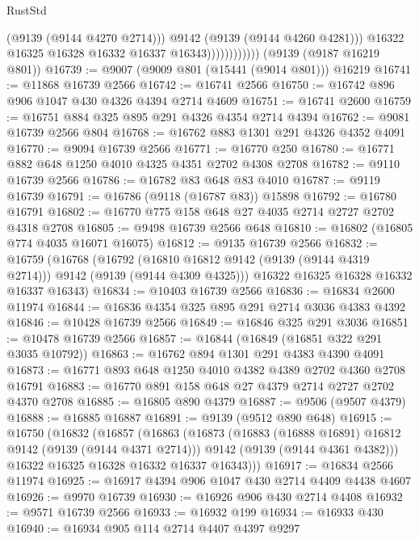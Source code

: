 \begin{lexlean}{RustStd}
\begin{coremodule}
                                (@9139 (@9144 @4270 @2714)))
                              @9142
                              (@9139 (@9144 @4260 @4281)))
                            @16322
                            @16325
                            @16328
                            @16332
                            @16337
                            @16343))))))))))))
    (@9139 (@9187 @16219 @801))
@16739 := @9007 (@9009 @801 (@15441 (@9014 @801))) @16219
@16741 := @11868 @16739 @2566
@16742 := @16741 @2566
@16750 := @16742 @896 @906 @1047 @430 @4326 @4394 @2714 @4609
@16751 := @16741 @2600
@16759 := @16751 @884 @325 @895 @291 @4326 @4354 @2714 @4394
@16762 := @9081 @16739 @2566 @804
@16768 := @16762 @883 @1301 @291 @4326 @4352 @4091
@16770 := @9094 @16739 @2566
@16771 := @16770 @250
@16780 := @16771 @882 @648 @1250 @4010 @4325 @4351 @2702 @4308 @2708
@16782 := @9110 @16739 @2566
@16786 := @16782 @83 @648 @83 @4010
@16787 := @9119 @16739
@16791 := @16786 (@9118 (@16787 @83)) @15898
@16792 := @16780 @16791
@16802 := @16770 @775 @158 @648 @27 @4035 @2714 @2727 @2702 @4318 @2708
@16805 := @9498 @16739 @2566 @648
@16810 := @16802 (@16805 @774 @4035 @16071 @16075)
@16812 := @9135 @16739 @2566
@16832 := @16759
    (@16768
      (@16792 (@16810 @16812 @9142 (@9139 (@9144 @4319 @2714))) @9142 (@9139 (@9144 @4309 @4325)))
      @16322
      @16325
      @16328
      @16332
      @16337
      @16343)
@16834 := @10403 @16739 @2566
@16836 := @16834 @2600 @11974
@16844 := @16836 @4354 @325 @895 @291 @2714 @3036 @4383 @4392
@16846 := @10428 @16739 @2566
@16849 := @16846 @325 @291 @3036
@16851 := @10478 @16739 @2566
@16857 := @16844 (@16849 (@16851 @322 @291 @3035 @10792))
@16863 := @16762 @894 @1301 @291 @4383 @4390 @4091
@16873 := @16771 @893 @648 @1250 @4010 @4382 @4389 @2702 @4360 @2708 @16791
@16883 := @16770 @891 @158 @648 @27 @4379 @2714 @2727 @2702 @4370 @2708
@16885 := @16805 @890 @4379
@16887 := @9506 (@9507 @4379)
@16888 := @16885 @16887
@16891 := @9139 (@9512 @890 @648)
@16915 := @16750
    (@16832
      (@16857
        (@16863
          (@16873
            (@16883 (@16888 @16891) @16812 @9142 (@9139 (@9144 @4371 @2714)))
            @9142
            (@9139 (@9144 @4361 @4382)))
          @16322
          @16325
          @16328
          @16332
          @16337
          @16343)))
@16917 := @16834 @2566 @11974
@16925 := @16917 @4394 @906 @1047 @430 @2714 @4409 @4438 @4607
@16926 := @9970 @16739
@16930 := @16926 @906 @430 @2714 @4408
@16932 := @9571 @16739 @2566
@16933 := @16932 @199
@16934 := @16933 @430
@16940 := @16934 @905 @114 @2714 @4407 @4397 @9297

\end{coremodule}
\end{lexlean}
